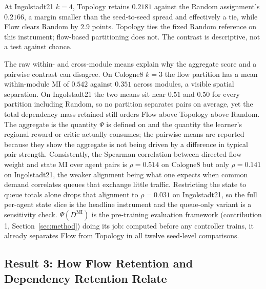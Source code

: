 \documentclass[journal]{IEEEtran}
\theoremstyle{definition}
\begin{document}
At Ingolstadt21 $k=4$, Topology retains $0.2181$ against the Random assignment's $0.2166$, a margin smaller than the seed-to-seed spread and effectively a tie, while Flow clears Random by $2.9$ points. Topology ties the fixed Random reference on this instrument; flow-based partitioning does not. The contrast is descriptive, not a test against chance.

The raw within- and cross-module means explain why the aggregate score and a pairwise contrast can disagree.  On Cologne8 $k=3$ the flow partition has a mean within-module MI of $0.542$ against $0.351$ across modules, a visible spatial separation.  On Ingolstadt21 the two means sit near $0.51$ and $0.50$ for every partition including Random, so no partition separates pairs on average, yet the total dependency mass retained still orders Flow above Topology above Random.  The aggregate is the quantity $\Psi$ is defined on and the quantity the learner's regional reward or critic actually consumes; the pairwise means are reported because they show the aggregate is not being driven by a difference in typical pair strength.  Consistently, the Spearman correlation between directed flow weight and state MI over agent pairs is $\rho=0.514$ on Cologne8 but only $\rho=0.141$ on Ingolstadt21, the weaker alignment being what one expects when common demand correlates queues that exchange little traffic.  Restricting the state to queue totals alone drops that alignment to $\rho=0.031$ on Ingolstadt21, so the full per-agent state slice is the headline instrument and the queue-only variant is a sensitivity check.  $\Psi(D^{\mathrm{MI}})$ is the pre-training evaluation framework (contribution 1, Section~\ref{sec:method}) doing its job: computed before any controller trains, it already separates Flow from Topology in all twelve seed-level comparisons.

\subsection{Result 3: How Flow Retention and Dependency Retention Relate}
\label{sec:exp-relation}
\end{document}
